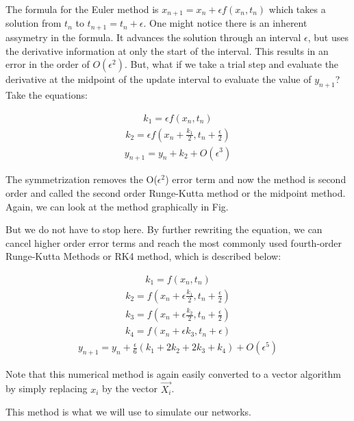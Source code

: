 \documentclass[10pt,letterpaper]{article}
\begin{document}
The formula for the Euler method is $x_{n+1}=x_n + \epsilon f(x_n,t_n)$ which takes a solution from $t_n$ to $t_{n+1}=t_n+\epsilon$. One might notice there is an inherent assymetry in the formula. It advances the solution through an interval $\epsilon$, but uses the derivative information at only the start of the interval. This results in an error in the order of $O(\epsilon^2)$. But, what if we take a trial step and evaluate the derivative at the midpoint of the update interval to evaluate the value of $y_{n+1}$? Take the equations:

\begin{eqnarray}k_1=\epsilon f(x_n,t_n)\end{eqnarray}
\begin{eqnarray}k_2=\epsilon f(x_n+\frac{k_1}{2},t_n+\frac{\epsilon}{2})\end{eqnarray}
\begin{eqnarray}y_{n+1}=y_n+k_2+O(\epsilon^3)\end{eqnarray}


The symmetrization removes the O($\epsilon^2$) error term and now the method is second order and called the second order Runge-Kutta method or the midpoint method. Again, we can look at the method graphically in Fig.

But we do not have to stop here. By further rewriting the equation, we can cancel higher order error terms and reach the most commonly used fourth-order Runge-Kutta Methods or RK4 method, which is described below:

\begin{eqnarray}k_1=f(x_n,t_n)\end{eqnarray}
\begin{eqnarray}k_2=f(x_n+\epsilon\frac{k_1}{2},t_n+\frac{\epsilon}{2})\end{eqnarray}
\begin{eqnarray}k_3=f(x_n+\epsilon\frac{k_2}{2},t_n+\frac{\epsilon}{2})\end{eqnarray}
\begin{eqnarray}k_4=f(x_n+\epsilon k_3,t_n+\epsilon)\end{eqnarray}
\begin{eqnarray}y_{n+1}=y_n+\frac{\epsilon}{6}(k_1+2 k_2+2 k_3+k_4)+O(\epsilon^5)\end{eqnarray}

Note that this numerical method is again easily converted to a vector algorithm by simply replacing $x_i$ by the vector $\vec{X_i}$. 

This method is what we will use to simulate our networks.
\end{document}
